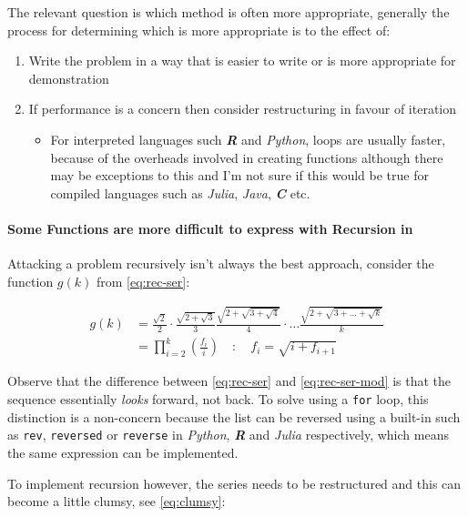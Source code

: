 \documentclass[11pt]{article}
\begin{document}
The relevant question is which method is often more appropriate, generally the process for
determining which is more appropriate is to the effect of:

\begin{enumerate}
\item Write the problem in a way that is easier to write or is more
appropriate for demonstration
\item If performance is a concern then consider restructuring in favour of iteration
\begin{itemize}
\item For interpreted languages such \textbf{\emph{R}} and \emph{Python}, loops are usually
faster, because of the overheads involved in creating functions
\cite{smolarskiMath60Notes2000} although there may be exceptions to this and
I'm not sure if this would be true for compiled languages such as \emph{Julia},
\emph{Java}, \textbf{\emph{C}} etc.
\end{itemize}
\end{enumerate}

\paragraph{Some Functions are more difficult to express with Recursion in}
\label{some-functions-are-more-difficult-to-express-with-recursion-in-python}
Attacking a problem recursively isn't always the best approach, consider the function \(g\left( k \right)\) from \eqref{eq:rec-ser}:


\begin{align}
    g\left( k \right) &=  \frac{\sqrt{2} }{2} \cdot   \frac{\sqrt{2+  \sqrt{3}}  }{3} \frac{\sqrt{2 +  \sqrt{3 +  \sqrt{4} } } }{4} \cdot  \ldots \frac{\sqrt{2 +  \sqrt{3 +  \ldots +  \sqrt{k} } } }{k} \nonumber \\
    &=  \prod^k_{i = 2} \left( \frac{f_i}{i}  \right) \quad : \quad f_{i} = \sqrt{i +  f_{i+1}} \nonumber
\end{align}

Observe that the difference between \eqref{eq:rec-ser} and \eqref{eq:rec-ser-mod} is
that the sequence essentially \emph{looks} forward, not back. To solve using a \texttt{for}
loop, this distinction is a non-concern because the list can be reversed using a built-in
such as \texttt{rev}, \texttt{reversed} or \texttt{reverse} in \emph{Python}, \textbf{\emph{R}} and \emph{Julia}
respectively, which means the same expression can be implemented.

To implement recursion however, the series needs to be restructured and this can become a little clumsy, see \eqref{eq:clumsy}:
\end{document}
